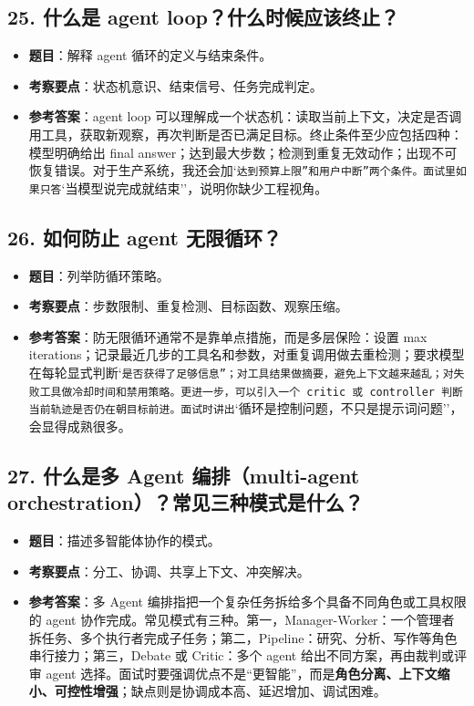 \subsection{25. 什么是 agent loop？什么时候应该终止？}
\begin{itemize}[leftmargin=2em]
\item \textbf{题目}：解释 agent 循环的定义与结束条件。
\item \textbf{考察要点}：状态机意识、结束信号、任务完成判定。
\item \textbf{参考答案}：agent loop 可以理解成一个状态机：读取当前上下文，决定是否调用工具，获取新观察，再次判断是否已满足目标。终止条件至少应包括四种：模型明确给出 final answer；达到最大步数；检测到重复无效动作；出现不可恢复错误。对于生产系统，我还会加`\texttt{达到预算上限''和}\texttt{用户中断''两个条件。面试里如果只答}`当模型说完成就结束''，说明你缺少工程视角。
\end{itemize}

\subsection{26. 如何防止 agent 无限循环？}
\begin{itemize}[leftmargin=2em]
\item \textbf{题目}：列举防循环策略。
\item \textbf{考察要点}：步数限制、重复检测、目标函数、观察压缩。
\item \textbf{参考答案}：防无限循环通常不是靠单点措施，而是多层保险：设置 max iterations；记录最近几步的工具名和参数，对重复调用做去重检测；要求模型在每轮显式判断`\texttt{是否获得了足够信息''；对工具结果做摘要，避免上下文越来越乱；对失败工具做冷却时间和禁用策略。更进一步，可以引入一个 critic 或 controller 判断当前轨迹是否仍在朝目标前进。面试时讲出}`循环是控制问题，不只是提示词问题''，会显得成熟很多。
\end{itemize}

\subsection{27. 什么是多 Agent 编排（multi-agent orchestration）？常见三种模式是什么？}
\begin{itemize}[leftmargin=2em]
\item \textbf{题目}：描述多智能体协作的模式。
\item \textbf{考察要点}：分工、协调、共享上下文、冲突解决。
\item \textbf{参考答案}：多 Agent 编排指把一个复杂任务拆给多个具备不同角色或工具权限的 agent 协作完成。常见模式有三种。第一，Manager-Worker：一个管理者拆任务、多个执行者完成子任务；第二，Pipeline：研究、分析、写作等角色串行接力；第三，Debate 或 Critic：多个 agent 给出不同方案，再由裁判或评审 agent 选择。面试时要强调优点不是``更智能''，而是\textbf{角色分离、上下文缩小、可控性增强}；缺点则是协调成本高、延迟增加、调试困难。
\end{itemize}

